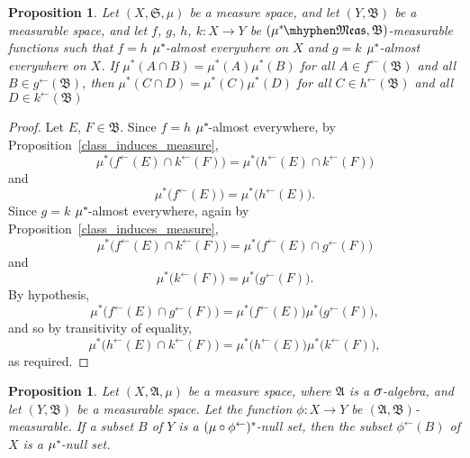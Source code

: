 \documentclass[
twoside=true,
paper=letter,
fontsize=11pt,
pagesize=auto,
leqno,
openany,
headsepline,
overfullrule,
]{scrbook}
\theoremstyle{plain}
\theoremstyle{plain}
\newtheorem{prop}[thm]{Proposition}
\theoremstyle{definition}
\theoremstyle{bfnoteitalic}
\theoremstyle{bfnoteroman}
\newcommand{\sigalg}[1]{\mathfrak{#1}}
\newcommand{\textsigma}{\hbox{\large{$\sigma$}}\kern-1pt}
\newcommand{\preimage}[1]{#1^{\leftarrow}}
\newcommand{\meets}{\cap}
\newcommand{\semiring}{\sigalg{S}}
\newcommand{\sigmaalgebra}{\sigalg{A}}
\newcommand{\sigmaalgebraii}{\sigalg{B}}
\newcommand{\measurable}[1]{{#1}\mhyphen\mathfrak{Meas}}
\newcommand{\kernast}{\ast\kern-1pt}
\newcommand{\measurespace}{X}
\newcommand{\measurespaceii}{Y}
\newcommand{\measure}{\mu}
\begin{document}
\begin{prop}\label{class_induced_measure}
Let $(\measurespace,\semiring,\measure)$ be a measure space, and let $(\measurespaceii, \sigmaalgebraii)$ be a measurable space, and let
$f$, $g$, $h$, $k:\measurespace\to\measurespaceii$ 
be $(\measurable{\measure^\kernast}, \sigmaalgebraii)$\hyp{}measurable functions such that 
$f = h$ $\measure^\kernast$-almost everywhere on $\measurespace$ and
$g = k$ $\measure^\kernast$-almost everywhere on $\measurespace$.
If $\measure^*(A\meets B) =\measure^*(A)\measure^*(B)$ for all $A\in\preimage{f}(\sigmaalgebraii)$ and 
all $B\in\preimage{g}(\sigmaalgebraii)$, then
$\measure^*(C\meets D) =\measure^*(C)\measure^*(D)$ for all $C\in\preimage{h}(\sigmaalgebraii)$ and 
all $D\in\preimage{k}(\sigmaalgebraii)$
\end{prop}

\begin{proof}
Let $E$, $F\in\sigmaalgebraii$.
Since $f=h$ $\measure^\kernast$-almost everywhere, 
by Proposition~\ref{class_induces_measure},
\[
\measure^*\bigl(\preimage{f}(E)\meets\preimage{k}(F)\bigr) 
= 
\measure^*\bigl(\preimage{h}(E)\meets\preimage{k}(F)\bigr)
\]
and
\[
\measure^*\bigl(\preimage{f}(E)\bigr) 
= 
\measure^*\bigl(\preimage{h}(E)\bigr).
\]
Since $g=k$ $\measure^\kernast$-almost everywhere, again
by Proposition~\ref{class_induces_measure},
\[
\measure^*\bigl(\preimage{f}(E)\meets\preimage{k}(F)\bigr) 
= 
\measure^*\bigl(\preimage{f}(E)\meets\preimage{g}(F)\bigr)
\]
and
\[
\measure^*\bigl(\preimage{k}(F)\bigr) 
= 
\measure^*\bigl(\preimage{g}(F)\bigr).
\]
By hypothesis,
\[
\measure^*\bigl(\preimage{f}(E)\meets\preimage{g}(F)\bigr)
=
\measure^*\bigl(\preimage{f}(E)\bigr)\measure^*\bigl(\preimage{g}(F)\bigr),
\]
and so by transitivity of equality,
\[
\measure^*\bigl(\preimage{h}(E)\meets\preimage{k}(F)\bigr)
=
\measure^*\bigl(\preimage{h}(E)\bigr)\measure^*\bigl(\preimage{k}(F)\bigr),
\]
as required.
\end{proof}


\begin{prop}\label{preimage_of_a_null_set}
Let $(\measurespace,\sigmaalgebra,\measure)$ be a measure space, where $\sigmaalgebra$ is a $\textsigma$-algebra, and let $(\measurespaceii, \sigmaalgebraii)$ be a measurable space.  Let the function $\phi:\measurespace\to\measurespaceii$ be $(\sigmaalgebra, \sigmaalgebraii)$\hyp{}measurable.
If a subset $B$ of $\measurespaceii$ is a $(\measure\circ\preimage{\phi})^\kernast$-null set, then  the subset $\preimage{\phi}(B)$ of $\measurespace$ is a $\measure^\kernast$-null set.
\end{prop}
\end{document}
